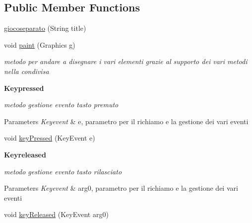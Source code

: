 \subsection*{Public Member Functions}
\begin{DoxyCompactItemize}
\item 
\hyperlink{classcargame_1_1giocoseparato_ae3a253caf075ef5655f9a36ef21b6852}{giocoseparato} (String title)
\item 
void \hyperlink{classcargame_1_1giocoseparato_a588c03edd1134c68bb729046b366a3c9}{paint} (Graphics g)
\begin{DoxyCompactList}\small\item\em metodo per andare a disegnare i vari elementi grazie al supporto dei vari metodi nella condivisa \end{DoxyCompactList}\end{DoxyCompactItemize}
\begin{Indent}\textbf{ Keypressed}\par
{\em metodo gestione evento tasto premuto


\begin{DoxyParams}{Parameters}
{\em Keyevent} & e, parametro per il richiamo e la gestione dei vari eventi \\
\hline
\end{DoxyParams}
}\begin{DoxyCompactItemize}
\item 
void \hyperlink{classcargame_1_1giocoseparato_aa12eb1084be2c4d9b03d5f248f00900d}{key\+Pressed} (Key\+Event e)
\end{DoxyCompactItemize}
\end{Indent}
\begin{Indent}\textbf{ Keyreleased}\par
{\em metodo gestione evento tasto rilasciato


\begin{DoxyParams}{Parameters}
{\em Keyevent} & arg0, parametro per il richiamo e la gestione dei vari eventi \\
\hline
\end{DoxyParams}
}\begin{DoxyCompactItemize}
\item 
void \hyperlink{classcargame_1_1giocoseparato_a9debbd2095df906c88381a23fbc0e5e0}{key\+Released} (Key\+Event arg0)
\end{DoxyCompactItemize}
\end{Indent}
